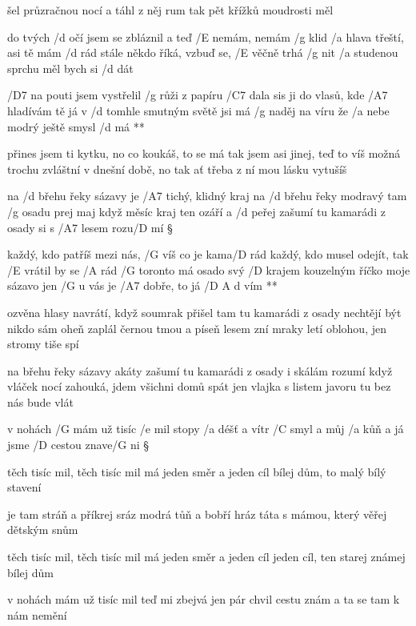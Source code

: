 šel průzračnou nocí a táhl z něj rum
tak pět křížků moudrosti měl




do tvých /d očí jsem se zbláznil a teď /E nemám, nemám /g klid
/a hlava třeští, asi tě mám /d rád
stále někdo říká, vzbuď se, /E věčně trhá /g nit
/a studenou sprchu měl bych si /d dát \songgg

\R /D7 na pouti jsem vystřelil /g růži z papíru
   /C7 dala sis ji do vlasů, kde /A7 hladívám tě já
   v /d tomhle smutným světě jsi má /g naděj na víru
   že /a nebe modrý ještě smysl /d má **

přines jsem ti kytku, no co koukáš, to se má
tak jsem asi jinej, teď to víš
možná trochu zvláštní v dnešní době, no tak ať
třeba z ní mou lásku vytušíš




na /d břehu řeky sázavy je /A7 tichý, klidný kraj
na /d břehu řeky modravý tam /g osadu prej maj
když měsíc kraj ten ozáří a /d peřej zašumí
tu kamarádi z osady si s /A7 lesem rozu/D mí \S

\R každý, kdo patříš mezi nás, /G víš co je kama/D rád
   každý, kdo musel odejít, tak /E vrátil by se /A rád
   /G toronto má osado svý /D krajem kouzelným
   říčko moje sázavo jen /G u vás je /A7 dobře, to já /{D A d} vím **

ozvěna hlasy navrátí, když soumrak přišel tam
tu kamarádi z osady nechtějí být nikdo sám
oheň zaplál černou tmou a píseň lesem zní
mraky letí oblohou, jen stromy tiše spí \s

na břehu řeky sázavy akáty zašumí
tu kamarádi z osady i skálám rozumí
když vláček nocí zahouká, jdem všichni domů spát
jen vlajka s listem javoru tu bez nás bude vlát




v nohách /G mám už tisíc /e mil
stopy /a déšť a vítr /C smyl
a můj /a kůň a já jsme /D cestou znave/G ni \S

těch tisíc mil, těch tisíc mil
má jeden směr a jeden cíl
bílej dům, to malý bílý stavení \s

je tam stráň a příkrej sráz
modrá tůň a bobří hráz
táta s mámou, který věřej dětským snům \s

těch tisíc mil, těch tisíc mil
má jeden směr a jeden cíl
jeden cíl, ten starej známej bílej dům \s

v nohách mám už tisíc mil
teď mi zbejvá jen pár chvil
cestu znám a ta se tam k nám nemění \s

